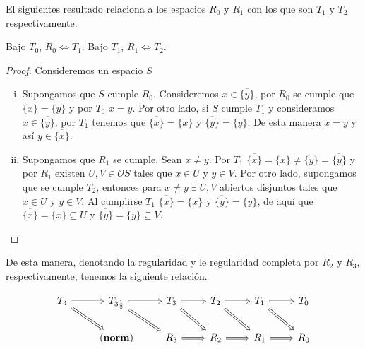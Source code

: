 \documentclass{comunicaciones}
\begin{document}
El siguientes resultado relaciona a los espacios $R_0$ y $R_1$ con los que son $T_1$ y $T_2$ respectivamente.

\begin{prop}\label{R0 y R1}
    Bajo $T_0$, $R_0 \Leftrightarrow T_1$. Bajo $T_1$, $R_1 \Leftrightarrow T_2$.
\end{prop}

\begin{proof}
Consideremos un espacio $S$
    \begin{enumerate}[i)]
        \item Supongamos que $S$ cumple $R_0$. Consideremos $x\in \overline{\{y\}}$, por $R_0$ se cumple que $\overline{\{x\}}=\overline{\{y\}}$ y por $T_0$ $x=y$. Por otro lado, si $S$ cumple $T_1$ y consideramos $x\in \overline{\{y\}}$, por $T_1$ tenemos que $\overline{\{x\}}=\{x\}$ y $\overline{\{y\}}=\{y\}$. De esta manera $x=y$ y así $y\in \overline{\{x\}}$.
        \item Supongamos que $R_1$ se cumple. Sean $x\neq y$. Por $T_1$ $\overline{\{x\}}=\{x\}\neq \{y\}=\overline{\{y\}}$ y por $R_1$ existen $U, V\in\mathcal{O}S$ tales que $x\in U$ y $y\in V$. Por otro lado, supongamos que se cumple $T_2$, entonces para $x\neq y \;\exists\; U, V$ abiertos disjuntos tales que $x\in U$ y $y\in V$. Al cumplirse $T_1$  $\overline{\{x\}}=\{x\}$ y $\overline{\{y\}}=\{y\}$, de aquí que $\overline{\{x\}}=\{x\}\subseteq U$ y $\overline{\{y\}}=\{y\}\subseteq V$.
    \end{enumerate}
\end{proof}

De esta manera, denotando la regularidad y le regularidad completa por $R_2$ y $R_3$, respectivamente, tenemos la siguiente relación.

    \[\begin{tikzcd}
	{T_4} & {T_{3\frac{1}{2}}} & {T_3} & {T_2} & {T_1} & {T_0} \\
	& {(\mathbf{norm})} & {R_3} & {R_2} & {R_1} & {R_0}
	\arrow[Rightarrow, from=1-2, to=1-3]
	\arrow[Rightarrow, from=1-3, to=1-4]
	\arrow[Rightarrow, from=1-4, to=1-5]
	\arrow[Rightarrow, from=1-5, to=1-6]
	\arrow[Rightarrow, from=1-1, to=1-2]
	\arrow[Rightarrow, from=1-1, to=2-2]
	\arrow[Rightarrow, from=1-2, to=2-3]
	\arrow[Rightarrow, from=1-3, to=2-4]
	\arrow[Rightarrow, from=1-4, to=2-5]
	\arrow[Rightarrow, from=1-5, to=2-6]
	\arrow[Rightarrow, from=2-3, to=2-4]
	\arrow[Rightarrow, from=2-4, to=2-5]
	\arrow[Rightarrow, from=2-5, to=2-6]
\end{tikzcd}\]
\end{document}
